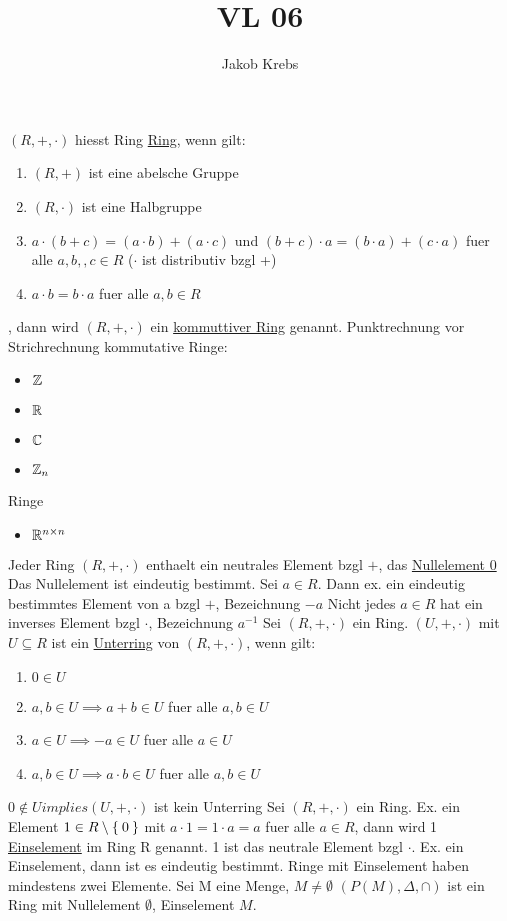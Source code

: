 \documentclass{../tudscript}
\title{VL 06}
\author{Jakob Krebs}
\begin{document}
$(R, +, \cdot)$ hiesst Ring \underline{Ring}, wenn gilt:
\begin{enumerate}
\item $(R, +)$ ist eine abelsche Gruppe
\item $(R, \cdot)$ ist eine Halbgruppe
\item $a \cdot (b + c) = (a \cdot b) + (a \cdot c)$ und $(b +c) \cdot a = (b \cdot a) + (c \cdot a)$ fuer alle $a, b, , c \in R$ ($\cdot$ ist distributiv bzgl +)
  \item $a \cdot b = b \cdot a$ fuer alle $a, b \in R$
\end{enumerate}
, dann wird $(R, +, \cdot)$ ein \underline{kommuttiver Ring} genannt.
Punktrechnung vor Strichrechnung
kommutative Ringe:
\begin{itemize}
\item $\mathbb{Z}$
\item $\mathbb{R}$
\item $\mathbb{C}$
\item $\mathbb{Z}_n$
\end{itemize}
Ringe
\begin{itemize}
\item $\mathbb{R}^{n \times n}$
\end{itemize}
Jeder Ring $(R, +, \cdot)$ enthaelt ein neutrales Element bzgl $+$, das \underline{Nullelement 0}
Das Nullelement ist eindeutig bestimmt.
Sei $a \in R$. Dann ex. ein eindeutig bestimmtes Element von a bzgl $+$, Bezeichnung $-a$
Nicht jedes $a \in R$ hat ein inverses Element bzgl $\cdot$, Bezeichnung $a^{-1}$
Sei $(R, +, \cdot)$ ein Ring. $(U, +, \cdot)$ mit $U \subseteq R$ ist ein \underline{Unterring} von $(R, +, \cdot)$, wenn gilt:
\begin{enumerate}
\item $0 \in U$
\item $a, b \in U \implies a +b \in U$ fuer alle $a, b \in U$
\item $a \in U \implies -a \in U$ fuer alle $a \in U$
\item $a, b \in  U\implies a \cdot b \in U$ fuer alle $a, b \in U$
\end{enumerate}
$0 \notin U implies (U, +, \cdot)$ ist kein Unterring
Sei $(R, +, \cdot)$ ein Ring.
Ex. ein Element $1 \in R \setminus \Set{0}$ mit $a \cdot 1 = 1 \cdot a = a$ fuer alle $a \in R$, dann wird 1 \underline{Einselement} im Ring R genannt.
1 ist das neutrale Element bzgl $\cdot$. Ex. ein Einselement, dann ist es eindeutig bestimmt. Ringe mit Einselement haben mindestens zwei Elemente.
Sei M eine Menge, $M \neq \emptyset$
$(P(M), \Delta, \cap)$ ist ein Ring mit Nullelement $\emptyset$, Einselement $M$.
\end{document}
